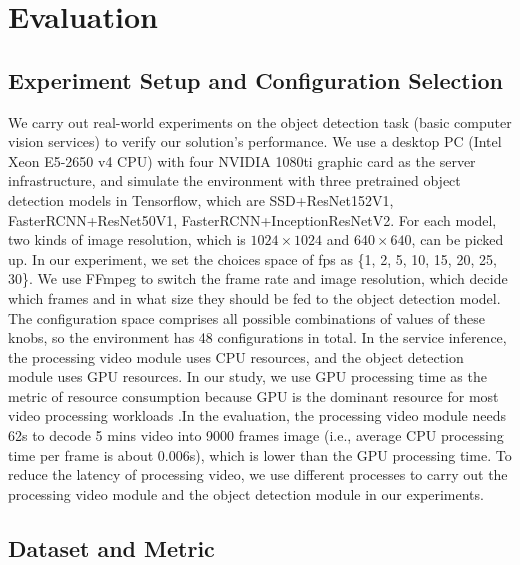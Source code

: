 \section{Evaluation}
\label{Section: experiment}

\subsection{Experiment Setup and Configuration Selection}
\label{subsec: configuration}
We carry out real-world experiments on the object detection task (basic computer vision services) to verify our solution’s performance. We use a desktop PC (Intel Xeon E5-2650 v4 CPU) with four NVIDIA 1080ti graphic card as the server infrastructure, and simulate the environment \cite{trade-offs} with three pretrained object detection models in Tensorflow, which are SSD+ResNet152V1, FasterRCNN+ResNet50V1, FasterRCNN+InceptionResNetV2. For each model, two kinds of image resolution, which is $1024\times1024$ and $640\times640$, can be picked up. In our experiment, we set the choices space of fps as \{1, 2, 5, 10, 15, 20, 25, 30\}. We use FFmpeg to switch the frame rate and image resolution, which decide which frames and in what size they should be fed to the object detection model. The configuration space comprises all possible combinations of values of these knobs, so the environment has 48 configurations in total. In the service inference, the processing video module uses CPU resources, and the object detection module uses GPU resources. In our study, we use GPU processing time as the metric of resource consumption because GPU is the dominant resource for most video processing workloads \cite{jiang2018chameleon}.In the evaluation, the processing video module needs 62s to decode 5 mins video into 9000 frames image (i.e., average CPU processing time per frame is about 0.006s), which is lower than the GPU processing time. To reduce the latency of processing video, we use different processes to carry out the processing video module and the object detection module in our experiments.   

\subsection{Dataset and Metric}
\label{subsec: datasets}

